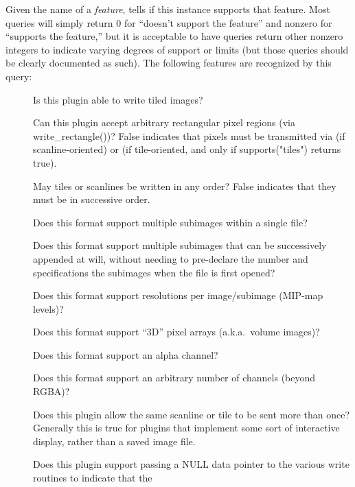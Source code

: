 \label{sec:supportsfeaturelist}
Given the name of a \emph{feature}, tells if this \ImageOutput  instance
supports that feature.  Most queries will simply return 0 for ``doesn't
support the feature'' and nonzero for ``supports the feature,'' but it is
acceptable to have queries return other nonzero integers to indicate varying
degrees of support or limits (but those queries should be clearly documented
as such). The following features are recognized by this query:
\begin{description}
\item[\spc] \spc 
\item[\rm {}] Is this plugin able to write tiled images?
\item[\rm {}] Can this plugin accept arbitrary rectangular
  pixel regions (via {\kw write_rectangle()})?  False indicates that
  pixels must be transmitted via \writescanline (if
  scanline-oriented) or \writetile (if tile-oriented, and only if
  {\kw supports("tiles")} returns true).
\item[\rm {}] May tiles or scanlines be written in any
  order?  False indicates that they must be in successive order.
\item[\rm {}] Does this format support multiple subimages
  within a single file?
\item[\rm {}] Does this format support multiple
  subimages that can be successively appended at will, without needing
  to pre-declare the number and specifications the subimages when the 
  file is first opened?
\item[\rm {}] Does this format support resolutions per
  image/subimage (MIP-map levels)?
\item[\rm {}] Does this format support ``3D'' pixel arrays
  (a.k.a.\ volume images)?
\item[\rm {}] Does this format support an alpha channel?
\item[\rm {}] Does this format support an arbitrary number
  of channels (beyond RGBA)?
\item[\rm {}] Does this plugin allow the same scanline or
  tile to be sent more than once?  Generally this is true for plugins
  that implement some sort of interactive display, rather than a saved
  image file.
\item[\rm {}] Does this plugin support passing a NULL data
  pointer to the various {\kw write} routines to indicate that the

\end{description}
